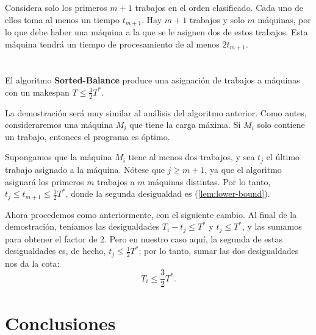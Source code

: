 \documentclass{report}
\begin{document}
		Considera solo los primeros \( m + 1 \) trabajos en el orden clasificado. Cada uno de ellos toma al menos un tiempo \( t_{m+1} \). Hay \( m + 1 \) trabajos y solo \( m \) máquinas, por lo que debe haber una máquina a la que se le asignen dos de estos trabajos. Esta máquina tendrá un tiempo de procesamiento de al menos \( 2t_{m+1} \).\\\\\\


		El algoritmo \textbf{Sorted-Balance} produce una asignación de trabajos a máquinas con un makespan \( T \leq \frac{3}{2} T^* \).

		La demostración será muy similar al análisis del algoritmo anterior. Como antes, consideraremos una máquina \( M_i \) que tiene la carga máxima. Si \( M_i \) solo contiene un trabajo, entonces el programa es óptimo.
		
		Supongamos que la máquina \( M_i \) tiene al menos dos trabajos, y sea \( t_j \) el último trabajo asignado a la máquina. Nótese que \( j \geq m + 1 \), ya que el algoritmo asignará los primeros \( m \) trabajos a \( m \) máquinas distintas. Por lo tanto, \( t_j \leq t_{m+1} \leq \frac{1}{2} T^* \), donde la segunda desigualdad es (\ref{lem:lower-bound}).
		
		Ahora procedemos como anteriormente, con el siguiente cambio. Al final de la demostración, teníamos las desigualdades \( T_i - t_j \leq T^* \) y \( t_j \leq T^* \), y las sumamos para obtener el factor de 2. Pero en nuestro caso aquí, la segunda de estas desigualdades es, de hecho, \( t_j \leq \frac{1}{2} T^* \); por lo tanto, sumar las dos desigualdades nos da la cota:
		\[
		T_i \leq \frac{3}{2} T^*.
		\]
	
		\chapter{Conclusiones}
		
	
	
	
	
\end{document}
